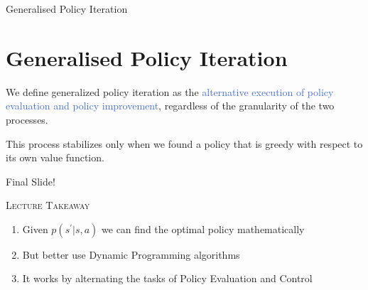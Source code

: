 \documentclass{beamer}
\newenvironment{takeaway}[1]{%
	\definecolor{shadecolor}{gray}{0.9}%
		\begin{shaded}{\color{skymagenta}\noindent\textsc{#1}}\\%
		}{%
		\end{shaded}%
}
\begin{document}
\begin{frame}{Generalised Policy Iteration}
\section{Generalised Policy Iteration}

We define generalized policy iteration as the \textcolor{RoyalBlue}{alternative execution of policy evaluation and policy improvement}, regardless of the granularity of the two processes.

\hspace{2mm}

This process stabilizes only when we found a policy that is greedy with respect to its own value function.

\end{frame}


\begin{frame}{Final Slide!}
	\begin{takeaway}{Lecture Takeaway}
		\begin{enumerate}
			\item Given $p(s^{\prime}|s,a)$ we can find the optimal policy mathematically
			\item But better use Dynamic Programming algorithms
			\item It works by alternating the tasks of Policy Evaluation and Control
		\end{enumerate}
	\end{takeaway}
\end{frame}
\end{document}
